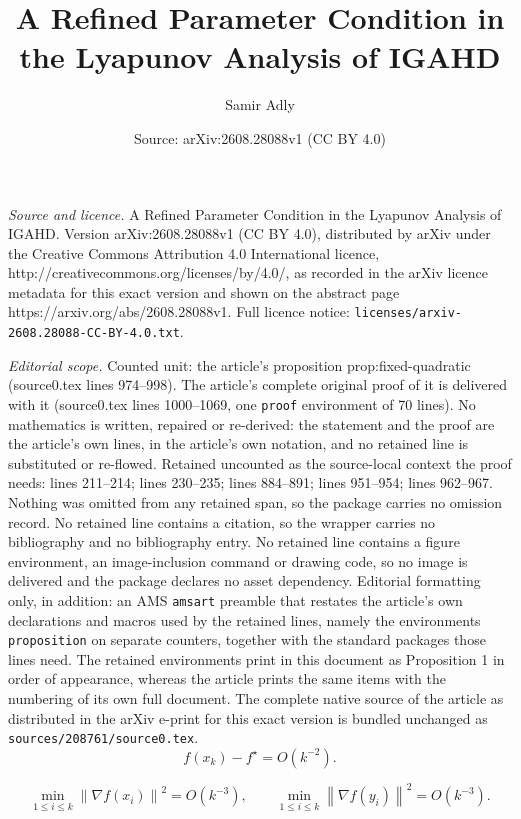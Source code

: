 \documentclass[10pt,a4paper]{amsart}
\title{A Refined Parameter Condition in the Lyapunov Analysis of IGAHD}
\author{Samir Adly}
\date{Source: arXiv:2608.28088v1 (CC BY 4.0)}
\newcommand{\norm}[1]{\left\lVert #1\right\rVert}
\begin{document}
\maketitle

\noindent\emph{Source and licence.} A Refined Parameter Condition in the Lyapunov Analysis of IGAHD. Version arXiv:2608.28088v1 (CC BY 4.0), distributed by arXiv under the Creative Commons Attribution 4.0 International licence, http://creativecommons.org/licenses/by/4.0/, as recorded in the arXiv licence metadata for this exact version and shown on the abstract page https://arxiv.org/abs/2608.28088v1. Full licence notice: \texttt{licenses/arxiv-2608.28088-CC-BY-4.0.txt}.\par\smallskip

\noindent\textit{Editorial scope.} Counted unit: the article's proposition prop:fixed-quadratic (source0.tex lines 974--998). The article's complete original proof of it is delivered with it (source0.tex lines 1000--1069, one \texttt{proof} environment of 70 lines). No mathematics is written, repaired or re-derived: the statement and the proof are the article's own lines, in the article's own notation, and no retained line is substituted or re-flowed.  Retained uncounted as the source-local context the proof needs: lines 211--214; lines 230--235; lines 884--891; lines 951--954; lines 962--967.  Nothing was omitted from any retained span, so the package carries no omission record.  No retained line contains a citation, so the wrapper carries no bibliography and no bibliography entry.  No retained line contains a figure environment, an image-inclusion command or drawing code, so no image is delivered and the package declares no asset dependency.  Editorial formatting only, in addition: an AMS \texttt{amsart} preamble that restates the article's own declarations and macros used by the retained lines, namely the environments \texttt{proposition} on separate counters, together with the standard packages those lines need.  The retained environments print in this document as Proposition 1 in order of appearance, whereas the article prints the same items with the numbering of its own full document.  The complete native source of the article as distributed in the arXiv e-print for this exact version is bundled unchanged as \texttt{sources/208761/source0.tex}.
\begin{equation}
\label{eq:objective-rate}
f(x_k)-f^\star=O(k^{-2}).
\end{equation}

\begin{equation}
\label{eq:best-iterate}
\min_{1\leq i\leq k}\norm{\nabla f(x_i)}^2=O(k^{-3}),
\qquad
\min_{1\leq i\leq k}\norm{\nabla f(y_i)}^2=O(k^{-3}).
\end{equation}
\end{document}
